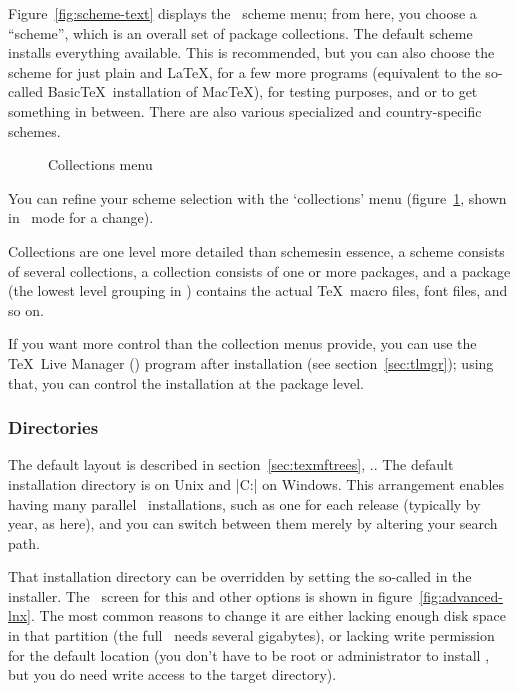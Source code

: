 \documentclass{article}
\begin{document}
Figure~\ref{fig:scheme-text} displays the \TL\ scheme menu; from here,
you choose a ``scheme'', which is an overall set of package collections.
The default  scheme installs everything available. This is
recommended, but you can also choose the  scheme for
just plain and \LaTeX,  for a few more programs
(equivalent to the so-called Basic\TeX\ installation of Mac\TeX),
 for testing purposes, and  or
 to get something in between. There are also various
specialized and country-specific schemes.

\begin{figure}[tb]
\def\figdesc{Collections menu}
\centering \tlpng{stdcoll}{.7\linewidth}{\figdesc}
\caption{\figdesc}\label{fig:collections-gui}
\end{figure}

You can refine your scheme selection with the `collections' menu
(figure~\ref{fig:collections-gui}, shown in \GUI\ mode for a change).

Collections are one level more detailed than schemes\Dash in essence, a
scheme consists of several collections, a collection consists of one or
more packages, and a package (the lowest level grouping in \TL) contains
the actual \TeX\ macro files, font files, and so on.

If you want more control than the collection menus provide, you can use
the \TeX\ Live Manager () program after installation (see
section~\ref{sec:tlmgr}); using that, you can control the installation
at the package level.

\subsubsection{Directories}
\label{sec:directories}

The default layout is described in section~\ref{sec:texmftrees},
\p.\pageref{sec:texmftrees}.  The default installation directory is
 on Unix and
|C:\texlive{}| on Windows.  This arrangement enables
having many parallel \TL\ installations, such as one for each release
(typically by year, as here), and you can switch between them merely by
altering your search path.

That installation directory can be overridden by setting the so-called
 in the installer.  The \GUI\ screen for this and other
options is shown in figure~\ref{fig:advanced-lnx}.  The most common reasons
to change it are either lacking enough disk space in that partition (the
full \TL\ needs several gigabytes), or lacking write permission for the
default location (you don't have to be root or administrator to install
\TL, but you do need write access to the target directory).
\end{document}
